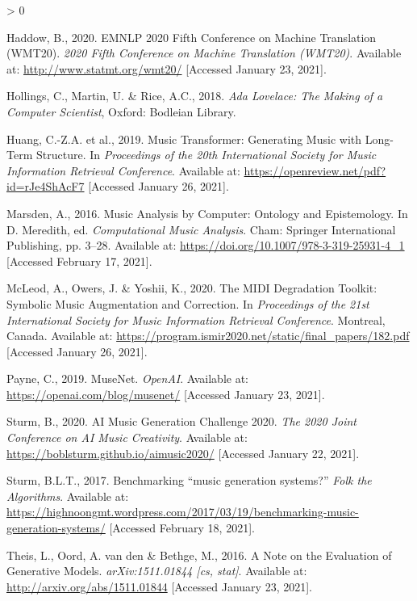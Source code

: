 \documentclass[12pt,a4paper,]{report}
\newlength{\cslhangindent}
\newenvironment{CSLReferences}[2] %
 {%
  \setlength{\parindent}{0pt}
  \ifodd #1 \everypar{\setlength{\hangindent}{\cslhangindent}}\ignorespaces\fi
  \ifnum #2 > 0
  \setlength{\parskip}{#2\baselineskip}
  \fi
 }%
 {}
\begin{document}
\begin{CSLReferences}{1}{0}
\leavevmode\hypertarget{ref-website_wmt_2020}{}%
Haddow, B., 2020. {EMNLP} 2020 {Fifth} {Conference} on {Machine}
{Translation} ({WMT20}). \emph{2020 Fifth Conference on Machine
Translation (WMT20)}. Available at: \url{http://www.statmt.org/wmt20/}
{[}Accessed January 23, 2021{]}.

\leavevmode\hypertarget{ref-hollings_ada_2018}{}%
Hollings, C., Martin, U. \& Rice, A.C., 2018. \emph{Ada {Lovelace}:
{The} {Making} of a {Computer} {Scientist}}, Oxford: Bodleian Library.

\leavevmode\hypertarget{ref-huang_music_2019}{}%
Huang, C.-Z.A. et al., 2019. Music {Transformer}: {Generating} {Music}
with {Long}-{Term} {Structure}. In \emph{Proceedings of the 20th
{International} {Society} for {Music} {Information} {Retrieval}
{Conference}}. Available at:
\url{https://openreview.net/pdf?id=rJe4ShAcF7} {[}Accessed January 26,
2021{]}.

\leavevmode\hypertarget{ref-marsden_music_2016}{}%
Marsden, A., 2016. Music {Analysis} by {Computer}: {Ontology} and
{Epistemology}. In D. Meredith, ed. \emph{Computational {Music}
{Analysis}}. Cham: Springer International Publishing, pp. 3--28.
Available at: \url{https://doi.org/10.1007/978-3-319-25931-4_1}
{[}Accessed February 17, 2021{]}.

\leavevmode\hypertarget{ref-mcleod_midi_2020}{}%
McLeod, A., Owers, J. \& Yoshii, K., 2020. The {MIDI} {Degradation}
{Toolkit}: {Symbolic} {Music} {Augmentation} and {Correction}. In
\emph{Proceedings of the 21st {International} {Society} for {Music}
{Information} {Retrieval} {Conference}}. Montreal, Canada. Available at:
\url{https://program.ismir2020.net/static/final_papers/182.pdf}
{[}Accessed January 26, 2021{]}.

\leavevmode\hypertarget{ref-payne_musenet_2019}{}%
Payne, C., 2019. {MuseNet}. \emph{OpenAI}. Available at:
\url{https://openai.com/blog/musenet/} {[}Accessed January 23, 2021{]}.

\leavevmode\hypertarget{ref-sturm_ai_2020}{}%
Sturm, B., 2020. {AI} {Music} {Generation} {Challenge} 2020. \emph{The
2020 Joint Conference on AI Music Creativity}. Available at:
\url{https://boblsturm.github.io/aimusic2020/} {[}Accessed January 22,
2021{]}.

\leavevmode\hypertarget{ref-sturm_benchmarking_2017}{}%
Sturm, B.L.T., 2017. Benchmarking {``music generation systems?''}
\emph{Folk the Algorithms}. Available at:
\url{https://highnoongmt.wordpress.com/2017/03/19/benchmarking-music-generation-systems/}
{[}Accessed February 18, 2021{]}.

\leavevmode\hypertarget{ref-theis_note_2016}{}%
Theis, L., Oord, A. van den \& Bethge, M., 2016. A {Note} on the
{Evaluation} of {Generative} {Models}. \emph{arXiv:1511.01844 {[}cs,
stat{]}}. Available at: \url{http://arxiv.org/abs/1511.01844}
{[}Accessed January 23, 2021{]}.

\end{CSLReferences}
\end{document}
